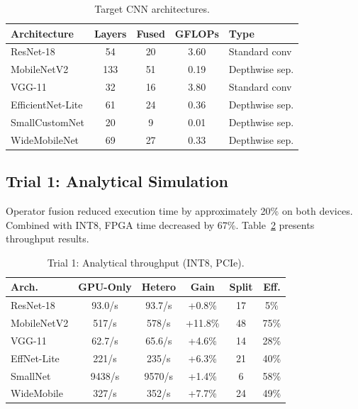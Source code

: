 \documentclass[runningheads]{llncs}
\begin{document}
\begin{table}
\caption{Target CNN architectures.}\label{tab:architectures}
\centering
\begin{tabular}{lcccl}
\toprule
\textbf{Architecture} & \textbf{Layers} & \textbf{Fused} & \textbf{GFLOPs} & \textbf{Type} \\
\midrule
ResNet-18 & 54 & 20 & 3.60 & Standard conv \\
MobileNetV2 & 133 & 51 & 0.19 & Depthwise sep. \\
VGG-11 & 32 & 16 & 3.80 & Standard conv \\
EfficientNet-Lite & 61 & 24 & 0.36 & Depthwise sep. \\
SmallCustomNet & 20 & 9 & 0.01 & Depthwise sep. \\
WideMobileNet & 69 & 27 & 0.33 & Depthwise sep. \\
\bottomrule
\end{tabular}
\end{table}

\subsection{Trial 1: Analytical Simulation}\label{sec:trial1}

Operator fusion reduced execution time by approximately 20\% on both devices. Combined with INT8, FPGA time decreased by 67\%. Table~\ref{tab:throughput_t1} presents throughput results.

\begin{table}
\caption{Trial 1: Analytical throughput (INT8, PCIe).}\label{tab:throughput_t1}
\centering
\begin{tabular}{lccccc}
\toprule
\textbf{Arch.} & \textbf{GPU-Only} & \textbf{Hetero} & \textbf{Gain} & \textbf{Split} & \textbf{Eff.} \\
\midrule
ResNet-18 & 93.0/s & 93.7/s & +0.8\% & 17 & 5\% \\
MobileNetV2 & 517/s & 578/s & +11.8\% & 48 & 75\% \\
VGG-11 & 62.7/s & 65.6/s & +4.6\% & 14 & 28\% \\
EffNet-Lite & 221/s & 235/s & +6.3\% & 21 & 40\% \\
SmallNet & 9438/s & 9570/s & +1.4\% & 6 & 58\% \\
WideMobile & 327/s & 352/s & +7.7\% & 24 & 49\% \\
\bottomrule
\end{tabular}
\end{table}
\end{document}
